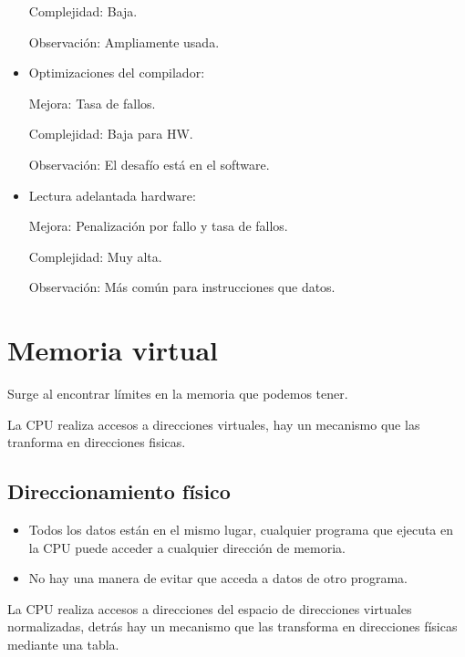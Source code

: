 \documentclass[12pt, twoside, openright]{report} %
\begin{document}
\begin{itemize}
	      Complejidad: Baja.

	      Observación: Ampliamente usada.

	\item Optimizaciones del compilador:

	      Mejora: Tasa de fallos.

	      Complejidad: Baja para HW.

	      Observación: El desafío está en el software.

	\item Lectura adelantada hardware:

	      Mejora: Penalización por fallo y tasa de fallos.

	      Complejidad: Muy alta.

	      Observación: Más común para instrucciones que datos.
\end{itemize}


\section{Memoria virtual}
\begin{figure}[H]
	{\def\svgwidth{.8\textwidth}
		}
\end{figure}


Surge al encontrar límites en la memoria que podemos tener.

La CPU realiza accesos a direcciones virtuales, hay un mecanismo que las tranforma en direcciones fisicas.

\subsection{Direccionamiento físico}
\begin{figure}[H]
	{\def\svgwidth{.8\textwidth}
		}
\end{figure}
\begin{itemize}
	\item Todos los datos están en el mismo lugar, cualquier programa que ejecuta en la CPU puede acceder a cualquier dirección de memoria.
	\item No hay una manera de evitar que acceda a datos de otro programa.
\end{itemize}

La CPU realiza accesos a direcciones del espacio de direcciones
virtuales normalizadas, detrás hay un mecanismo que las transforma
en direcciones físicas mediante una tabla.
\end{document}
